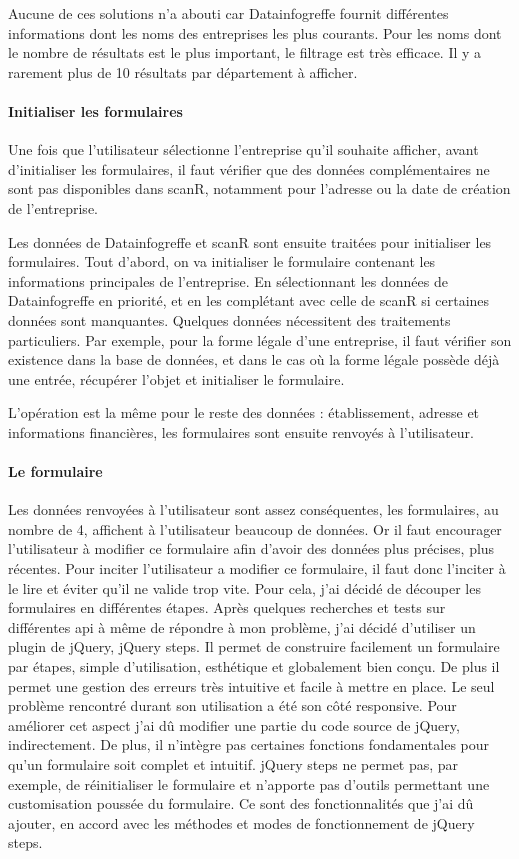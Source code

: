 \documentclass[french]{article}
\begin{document}
{Aucune de ces solutions n'a abouti car Datainfogreffe fournit différentes informations dont les noms des entreprises les plus courants. Pour les noms dont le nombre de résultats est le plus important, le filtrage est très efficace. Il y a rarement plus de 10 résultats par département à afficher. 

\paragraph{Initialiser les formulaires}

Une fois que l'utilisateur sélectionne l'entreprise qu'il souhaite afficher, avant d'initialiser les formulaires, il faut vérifier que des données complémentaires ne sont pas disponibles dans scanR, notamment pour l'adresse ou la date de création de l'entreprise.

Les données de Datainfogreffe et scanR sont ensuite traitées pour initialiser les formulaires. Tout d'abord, on va initialiser le formulaire contenant les informations principales de l'entreprise. En sélectionnant les données de Datainfogreffe en priorité, et en les complétant avec celle de scanR si certaines données sont manquantes. Quelques données nécessitent des traitements particuliers. Par exemple, pour la forme légale d'une entreprise, il faut vérifier son existence dans la base de données, et dans le cas où la forme légale possède déjà une entrée, récupérer l'objet et initialiser le formulaire.

L'opération est la même pour le reste des données : établissement, adresse et informations financières, les formulaires sont ensuite renvoyés à l'utilisateur.

\paragraph{Le formulaire}

Les données renvoyées à l'utilisateur sont assez conséquentes, les formulaires, au nombre de 4, affichent à l'utilisateur beaucoup de données. Or il faut encourager l'utilisateur à modifier ce formulaire afin d'avoir des données plus précises, plus récentes. Pour inciter l'utilisateur a modifier ce formulaire, il faut donc l'inciter à le lire et éviter qu'il ne valide trop vite. Pour cela, j'ai décidé de découper les formulaires en différentes étapes. Après quelques recherches et tests sur différentes api à même de répondre à mon problème, j'ai décidé d'utiliser un plugin de jQuery, jQuery steps. Il permet de construire facilement un formulaire par étapes, simple d'utilisation, esthétique et globalement bien conçu. De plus il permet une gestion des erreurs très intuitive et facile à mettre en place. Le seul problème rencontré durant son utilisation a été son côté responsive. Pour améliorer cet aspect j'ai dû modifier une partie du code source de jQuery, indirectement. De plus, il n'intègre pas certaines fonctions fondamentales pour qu'un formulaire soit complet et intuitif. jQuery steps ne permet pas, par exemple, de réinitialiser le formulaire et n'apporte pas d'outils permettant une customisation poussée du formulaire. Ce sont des fonctionnalités que j'ai dû ajouter, en accord avec les méthodes et modes de fonctionnement de jQuery steps.

}
\end{document}
